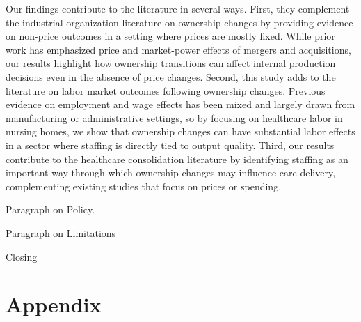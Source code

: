 \documentclass[preprint,authoryear]{elsarticle}
\begin{document}
Our findings contribute to the literature in several ways. First, they complement the industrial organization literature on ownership changes by providing evidence on non-price outcomes in a setting where prices are mostly fixed. While prior work has emphasized price and market-power effects of mergers and acquisitions, our results highlight how ownership transitions can affect internal production decisions even in the absence of price changes. Second, this study adds to the literature on labor market outcomes following ownership changes. Previous evidence on employment and wage effects has been mixed and largely drawn from manufacturing or administrative settings, so by focusing on healthcare labor in nursing homes, we show that ownership changes can have substantial labor effects in a sector where staffing is directly tied to output quality. Third, our results contribute to the healthcare consolidation literature by identifying staffing as an important way through which ownership changes may influence care delivery, complementing existing studies that focus on prices or spending.

Paragraph on Policy.

Paragraph on Limitations

Closing

\section{Appendix}


\FloatBarrier


\FloatBarrier

\nocite{*}


\end{document}
